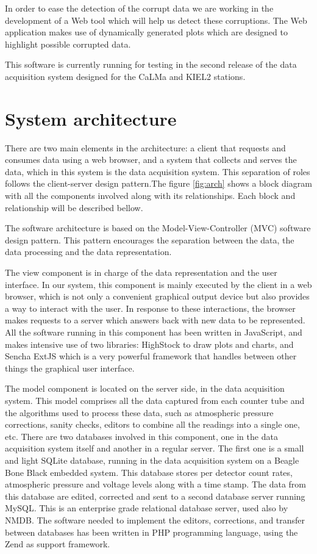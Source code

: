 \documentclass[a4paper]{jpconf}
\begin{document}
In order to ease the detection of the corrupt data we are working in the
development of a Web tool which will help us detect these corruptions. The Web
application makes use of dynamically generated plots which are designed to
highlight possible corrupted data.

This software is currently running for testing in the second release of the data
acquisition system\cite{Garcia2014} designed for the CaLMa\cite{Medina2013} and
KIEL2 stations.


\section{System architecture}

There are two main elements in the architecture: a client that requests and
consumes data using a web browser, and a system that collects and serves the
data, which in this system is the data acquisition system. This separation of
roles follows the client-server design pattern\cite{wiki:ClientServer}.The
figure \ref{fig:arch} shows a block diagram with all the components involved
along with its relationships. Each block and relationship will be described
bellow.

The software architecture is based on the Model-View-Controller (MVC) software
design pattern\cite{wiki:MVC}. This pattern encourages the separation between
the data, the data processing and the data representation. 

The view component is in charge of the data representation and the user
interface. In our system, this component is mainly executed by the client in a
web browser, which is not only a convenient graphical output device but also
provides a way to interact with the user. In response to these interactions, the
browser makes requests to a server which answers back with new data to be
represented. All the software running in this component has been written in
JavaScript, and makes intensive use of two libraries:
HighStock\cite{web:highstock} to draw plots and charts, and Sencha
ExtJS\cite{web:extjs} which is a very powerful framework that handles between
other things the graphical user interface.

The model component is located on the server side, in the data acquisition
system. This model comprises all the data captured from each counter tube and
the algorithms used to process these data, such as atmospheric pressure
corrections, sanity checks, editors to combine all the readings into a single
one, etc. There are two databases involved in this component, one in the data
acquisition system itself and another in a regular server. The first one is a
small and light SQLite database, running in the data acquisition system on a
Beagle Bone Black embedded system\cite{Garcia2014}. This database stores per
detector count rates, atmospheric pressure and voltage levels along with a time
stamp. The data from this database are edited, corrected and sent to a second
database server running MySQL\cite{web:mysql}. This is an enterprise grade
relational database server, used also by NMDB. The software needed to implement
the editors, corrections, and transfer between databases has been written in PHP
programming language, using the Zend\cite{web:zend} as support framework.
\end{document}
